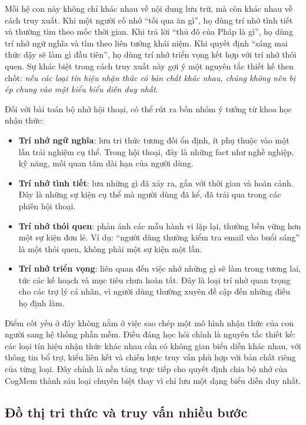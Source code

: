 \documentclass[../main.tex]{subfiles}
\begin{document}
Mỗi hệ con này không chỉ khác nhau về nội dung lưu trữ, mà còn khác nhau về cách truy xuất. Khi một người cố nhớ ``tối qua ăn gì'', họ dùng trí nhớ tình tiết và thường tìm theo mốc thời gian. Khi trả lời ``thủ đô của Pháp là gì'', họ dùng trí nhớ ngữ nghĩa và tìm theo liên tưởng khái niệm. Khi quyết định ``sáng mai thức dậy sẽ làm gì đầu tiên'', họ dùng trí nhớ triển vọng kết hợp với trí nhớ thói quen. Sự khác biệt trong cách truy xuất này gợi ý một nguyên tắc thiết kế then chốt: \textit{nếu các loại tín hiệu nhận thức có bản chất khác nhau, chúng không nên bị ép chung vào một kiểu biểu diễn duy nhất}.

Đối với bài toán bộ nhớ hội thoại, có thể rút ra bốn nhóm ý tưởng từ khoa học nhận thức:

\begin{itemize}
    \item \textbf{Trí nhớ ngữ nghĩa}: lưu tri thức tương đối ổn định, ít phụ thuộc vào một lần trải nghiệm cụ thể. Trong hội thoại, đây là những fact như nghề nghiệp, kỹ năng, mối quan tâm dài hạn của người dùng.
    \item \textbf{Trí nhớ tình tiết}: lưu những gì đã xảy ra, gắn với thời gian và hoàn cảnh. Đây là những sự kiện cụ thể mà người dùng đã kể, đã trải qua trong các phiên hội thoại.
    \item \textbf{Trí nhớ thói quen}: phản ánh các mẫu hành vi lặp lại, thường bền vững hơn một sự kiện đơn lẻ. Ví dụ: ``người dùng thường kiểm tra email vào buổi sáng'' là một thói quen, không phải một sự kiện một lần.
    \item \textbf{Trí nhớ triển vọng}: liên quan đến việc nhớ những gì sẽ làm trong tương lai, tức các kế hoạch và mục tiêu chưa hoàn tất. Đây là loại trí nhớ quan trọng cho các trợ lý cá nhân, vì người dùng thường xuyên đề cập đến những điều họ định làm.
\end{itemize}

Điểm cốt yếu ở đây không nằm ở việc sao chép một mô hình nhận thức của con người sang hệ thống phần mềm. Điều đáng học hỏi chính là nguyên tắc thiết kế: các loại tín hiệu nhận thức khác nhau cần có không gian biểu diễn khác nhau, với thông tin bổ trợ, kiểu liên kết và chiến lược truy vấn phù hợp với bản chất riêng của từng loại. Đây chính là nền tảng trực tiếp cho quyết định chia bộ nhớ của CogMem thành sáu loại chuyên biệt thay vì chỉ lưu một dạng biểu diễn duy nhất.

\subsection{Đồ thị tri thức và truy vấn nhiều bước}
\end{document}
